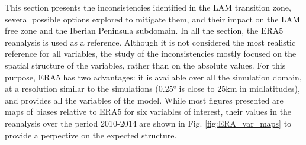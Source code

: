 This section presents the inconsistencies identified in the LAM transition zone, several possible options explored to mitigate them, and their impact on the LAM free zone and the Iberian Peninsula subdomain. In all the section, the ERA5 reanalysis is used as a reference. Although it is not considered the most realistic reference for all variables, the study of the inconsistencies mostly focused on the spatial structure of the variables, rather than on the absolute values.
For this purpose, ERA5 has two advantages: it is available over all the simulation domain, at a resolution similar to the simulations (0.25° is close to 25km in midlatitudes), and provides all the variables of the model.
While most figures presented are maps of biases relative to ERA5 for six variables of interest, their values in the reanalysis over the period 2010-2014 are shown in Fig. \ref{fig:ERA_var_maps} to provide a perpective on the expected structure.

